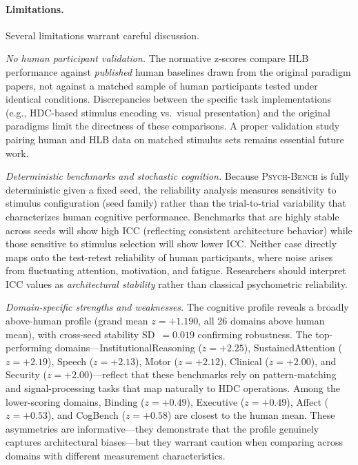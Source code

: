 \documentclass[11pt,letterpaper]{article}
\newcommand{\psychbench}{\textsc{Psych-Bench}}
\newcommand{\hlb}{\textsc{HLB}}
\begin{document}
\paragraph{Limitations.} Several limitations warrant careful discussion.

\emph{No human participant validation.} The normative z-scores compare \hlb{} performance against \emph{published} human baselines drawn from the original paradigm papers, not against a matched sample of human participants tested under identical conditions. Discrepancies between the specific task implementations (e.g., HDC-based stimulus encoding vs.\ visual presentation) and the original paradigms limit the directness of these comparisons. A proper validation study pairing human and \hlb{} data on matched stimulus sets remains essential future work.

\emph{Deterministic benchmarks and stochastic cognition.} Because \psychbench{} is fully deterministic given a fixed seed, the reliability analysis measures sensitivity to stimulus configuration (seed family) rather than the trial-to-trial variability that characterizes human cognitive performance. Benchmarks that are highly stable across seeds will show high ICC (reflecting consistent architecture behavior) while those sensitive to stimulus selection will show lower ICC. Neither case directly maps onto the test-retest reliability of human participants, where noise arises from fluctuating attention, motivation, and fatigue. Researchers should interpret ICC values as \emph{architectural stability} rather than classical psychometric reliability.

\emph{Domain-specific strengths and weaknesses.} The cognitive profile reveals a broadly above-human profile (grand mean $z = +1.190$, all 26 domains above human mean), with cross-seed stability SD~$= 0.019$ confirming robustness. The top-performing domains---InstitutionalReasoning ($z = +2.25$), SustainedAttention ($z = +2.19$), Speech ($z = +2.13$), Motor ($z = +2.12$), Clinical ($z = +2.00$), and Security ($z = +2.00$)---reflect that these benchmarks rely on pattern-matching and signal-processing tasks that map naturally to HDC operations. Among the lower-scoring domains, Binding ($z = +0.49$), Executive ($z = +0.49$), Affect ($z = +0.53$), and CogBench ($z = +0.58$) are closest to the human mean. These asymmetries are informative---they demonstrate that the profile genuinely captures architectural biases---but they warrant caution when comparing across domains with different measurement characteristics.
\end{document}
